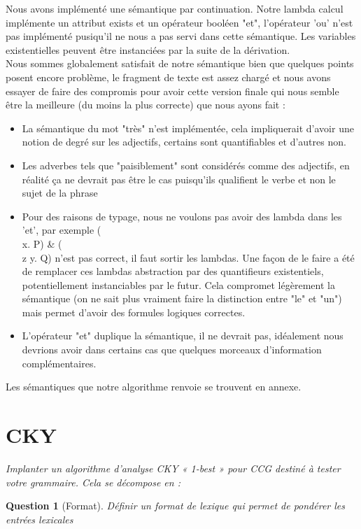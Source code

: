 \documentclass[12pt]{article}
\theoremstyle{exostyle}
\newtheorem{exo}{Question}[section]
\begin{document}
Nous avons implémenté une sémantique par continuation. Notre lambda calcul implémente un attribut exists et un opérateur booléen "et", l'opérateur 'ou' n'est pas implémenté pusiqu'il ne nous a pas servi dans cette sémantique. Les variables existentielles peuvent être instanciées par la suite de la dérivation.\\
Nous sommes globalement satisfait de notre sémantique bien que quelques points posent encore problème, le fragment de texte est assez chargé et nous avons essayer de faire des compromis pour avoir cette version finale qui nous semble être la meilleure (du moins la plus correcte) que nous ayons fait :
\begin{itemize}
	\item La sémantique du mot "très" n'est implémentée, cela impliquerait d'avoir une notion de degré sur les adjectifs, certains sont quantifiables et d'autres non.
	\item Les adverbes tels que "paisiblement" sont considérés comme des adjectifs, en réalité ça ne devrait pas être le cas puisqu'ils qualifient le verbe et non le sujet de la phrase
	\item Pour des raisons de typage, nous ne voulons pas avoir des lambda dans les 'et', par exemple (\\x. P) \& (\\z y. Q) n'est pas correct, il faut sortir les lambdas. Une façon de le faire a été de remplacer ces lambdas abstraction par des quantifieurs existentiels, potentiellement instanciables par le futur. Cela compromet légèrement la sémantique (on ne sait plus vraiment faire la distinction entre "le" et "un") mais permet d'avoir des formules logiques correctes.
	\item L'opérateur "et" duplique la sémantique, il ne devrait pas, idéalement nous devrions avoir dans certains cas que quelques morceaux d'information complémentaires.
\end{itemize}

Les sémantiques que notre algorithme renvoie se trouvent en annexe.

\section{CKY}
\textit{Implanter un algorithme d’analyse CKY « 1-best » pour CCG destiné à tester votre grammaire. Cela se décompose en :}

\begin{exo}[Format]
\textit{Définir un format de lexique qui permet de pondérer les entrées lexicales}
\end{exo}
\end{document}
